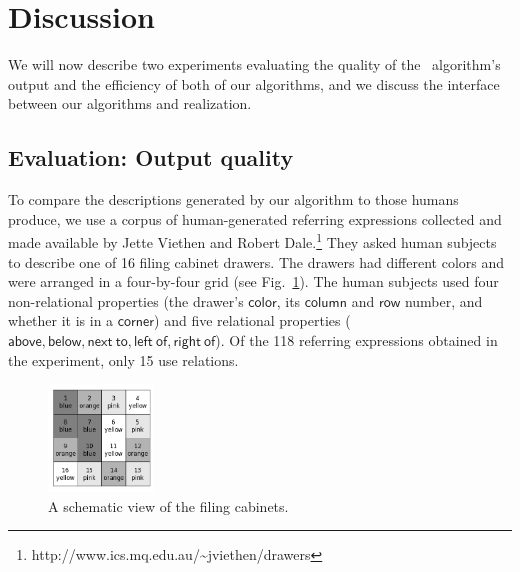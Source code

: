 \section{Discussion} \label{sec:discussion}

We will now describe two experiments evaluating the quality of the \el\
algorithm's output and the efficiency of both of our algorithms, and
we discuss the interface between our algorithms and realization.





\subsection{Evaluation: Output quality}

To compare the descriptions generated by our algorithm to those humans
produce, we use a corpus of human-generated referring expressions
collected and made available by Jette Viethen and Robert
Dale.\footnote{http://www.ics.mq.edu.au/\~{}jviethen/drawers} They
asked human subjects to describe one of 16 filing cabinet drawers. The
drawers had different colors and were arranged in a four-by-four grid
(see Fig.~\ref{fig:drawers}). The human subjects used four
non-relational properties (the drawer's $\mathsf{color}$, its
$\mathsf{column}$ and $\mathsf{row}$ number, and whether it is in a
$\mathsf{corner}$) and five relational properties ($\mathsf{above,
  below, next\ to, left\ of, right\ of}$). Of the 118 referring
expressions obtained in the experiment, only 15 use relations.

\begin{figure}
\begin{center}
\includegraphics[width=0.25\textwidth]{drawers.png}
\end{center}\vspace*{-3ex}
\caption{A schematic view of the filing cabinets.}\label{fig:drawers}\vspace*{-3ex}
\end{figure}


